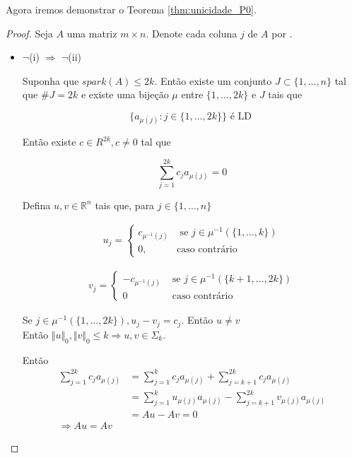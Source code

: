 Agora iremos demonstrar o Teorema \ref{thm:unicidade_P0}.
\begin{proof}
Seja $A$ uma matriz $m \times n$. Denote cada coluna $j$ de $A$ por .
\begin{itemize}
\item $\neg$(i) $\Rightarrow$ $\neg$(ii)

Suponha que $\textit{spark}(A) \leq 2k$. Então existe um conjunto $J \subset \lbrace 1, \hdots, n \rbrace$  tal que $\#J = 2k$ e existe uma bijeção $\mu$ entre $\lbrace 1, \hdots, 2k \rbrace$ e $J$ tais que

$$ \lbrace a_{\mu(j)} : j \in \lbrace 1, \hdots, 2k \rbrace \rbrace \text{ é LD }$$

Então existe $c \in R^{2k}, c \neq 0$ tal que

$$ \sum_{j = 1}^{2k} c_j a_{\mu(j)} = 0$$

Defina $u, v \in \mathbb{R}^n$ tais que, para $j \in \lbrace 1, \hdots, n \rbrace$

\begin{subequations}
\begin{align*}
u_j = 
\begin{cases}
c_{\mu^{-1}(j)} & \text{ se } j \in \mu^{-1}(\lbrace 1, \hdots, k \rbrace) \\
0, & \text{caso contrário}
\end{cases}
\end{align*}
\end{subequations}

\begin{subequations}
\begin{align*}
v_j = \begin{cases}
 -c_{\mu^{-1}(j)} & \text{ se } j \in \mu^{-1}(\lbrace k+1, \hdots, 2k \rbrace)\\
  0 &\text{ caso contrário}
\end{cases}
\end{align*}
\end{subequations}


Se $j \in \mu^{-1}(\lbrace 1, \hdots, 2k \rbrace), u_j - v_j = c_j$. Então $u \neq v$\\
Então $\Vert u \Vert_0, \Vert v \Vert_0 \leq k \Rightarrow u, v \in \Sigma_k$.

Então
\begin{subequations}
\begin{align*}
\sum_{j = 1}^{2k} c_j a_{\mu(j)} &= \sum_{j = 1}^{k} c_j a_{\mu(j)} + \sum_{j = k+1}^{2k} c_j a_{\mu(j)}\\
& = \sum_{j = 1}^{k} u_{\mu(j)} a_{\mu(j)} - \sum_{j = k+1}^{2k} v_{\mu(j)} a_{\mu(j)} \\
& = Au - Av = 0 \\
 \Rightarrow Au = Av
\end{align*}
\end{subequations}


\end{itemize}
\end{proof}
